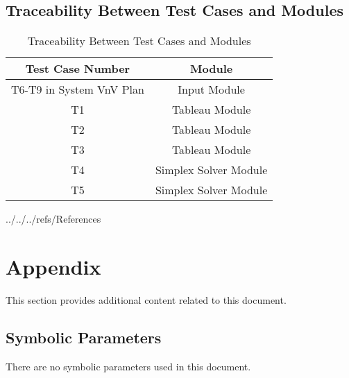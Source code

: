 \documentclass[12pt, titlepage]{article}
\begin{document}
\subsection{Traceability Between Test Cases and Modules}

\begin{table} [h!]
	\centering
	\begin{tabular}{|c|c|}
		\hline	
		\textbf{Test Case Number} & \textbf{Module}\\
		\hline 
		T6-T9 in System VnV Plan& Input Module\\ \hline
		T1& Tableau Module\\ \hline
		T2& Tableau Module\\ \hline
		T3& Tableau Module\\ \hline
		T4& Simplex Solver Module\\ \hline
		T5& Simplex Solver Module\\ \hline
	\end{tabular}
	\caption{Traceability Between Test Cases and Modules}
	\label{Table:Traceability} 
\end{table}

\newpage


 {../../../refs/References}

\newpage

\section{Appendix}

This section provides additional content related to this document.

\subsection{Symbolic Parameters}

There are no symbolic parameters used in this document.
\end{document}

